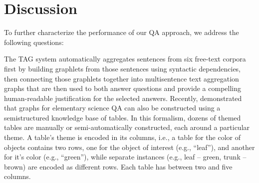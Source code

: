 \section{Discussion}
\label{sec-cl2017:discussion}

To further characterize the performance of our QA approach, we address the following questions: 


%

{} The TAG system automatically aggregates sentences from six free-text corpora first by building graphlets from those sentences using syntactic dependencies, then connecting those graphlets together into multisentence text aggregation graphs that are then used to both answer questions and provide a compelling human-readable justification for the selected answers.  Recently, \citet{Khashabi2016QuestionAV} demonstrated that graphs for elementary science QA can also be constructed using a semistructured knowledge base of tables.  In this formalism, dozens of themed tables are manually or semi-automatically constructed, each around a particular theme.  A table's theme is encoded in its columns, i.e., a table for the color of objects contains two rows, one for the object of interest (e.g., ``leaf''), and another for it's color (e.g., ``green''), while separate instances (e.g., leaf -- green, trunk -- brown) are encoded as different rows.  Each table has between two and five columns.  

